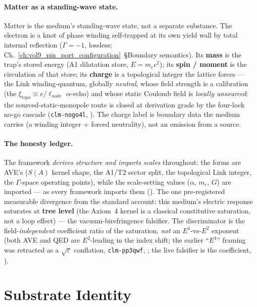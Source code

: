 \paragraph{Matter as a standing-wave state.} Matter is the medium's standing-wave state, not a separate substance. The electron is a knot of phase winding self-trapped at its own yield wall by total internal reflection ($\Gamma = -1$\gammaundeclared{}, lossless; Ch.~\ref{ch:vol9_pin_port_configuration}~\S Boundary semantics). Its \textbf{mass} is the trap's stored energy (A1 dilatation store, $E = m_e c^2$); its \textbf{spin / moment} is the circulation of that store; its \textbf{charge} is a topological integer the lattice forces --- the $\mathrm{Link}$ winding-quantum, globally \emph{neutral}, whose field strength is a calibration (the $\xi_{topo} \equiv e/\ell_{node}$ $\alpha$-echo) and whose static Coulomb field is \emph{locally unsourced}: the sourced-static-monopole route is closed at derivation grade by the four-lock no-go cascade (\texttt{clm-nogo4l}, ). The charge label is boundary data the medium carries (a winding integer $+$ forced neutrality), not an emission from a source.

\paragraph{The honesty ledger.} The framework \emph{derives structure and imports scales} throughout: the forms are AVE's ($S(A)$ kernel shape, the A1/T2 sector split, the topological $\mathrm{Link}$ integer, the $\Gamma$-space operating points), while the scale-setting values ($\alpha$, $m_e$, $G$) are imported --- as every framework imports them (). The one pre-registered measurable divergence from the standard account: this medium's electric response saturates at \textbf{tree level} (the Axiom~4 kernel is a classical constitutive saturation, not a loop effect) --- the vacuum-birefringence falsifier. The discriminator is the field-\emph{independent} coefficient ratio of the saturation, \emph{not} an $E^4$-vs-$E^2$ exponent (both AVE and QED are $E^2$-leading in the index shift; the earlier ``$E^4$'' framing was retracted as a $\sqrt{\varepsilon}$ conflation, \texttt{clm-pp3qwf}, ; the live falsifier is the coefficient, ).

\section{Substrate Identity}
\label{sec:vol9_substrate_identity}

